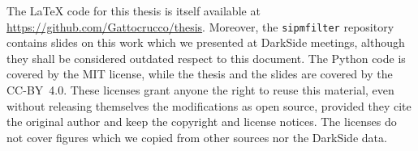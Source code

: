 The \LaTeX{} code for this thesis is itself available at
\url{https://github.com/Gattocrucco/thesis}. Moreover, the
\nolinkurl{sipmfilter} repository contains slides on this work which we
presented at DarkSide meetings, although they shall be considered outdated
respect to this document. The Python code is covered by the MIT license, while
the thesis and the slides are covered by the CC-BY~4.0. These licenses grant
anyone the right to reuse this material, even without releasing themselves the
modifications as open source, provided they cite the original author and keep
the copyright and license notices. The licenses do not cover figures which we
copied from other sources nor the DarkSide data.
